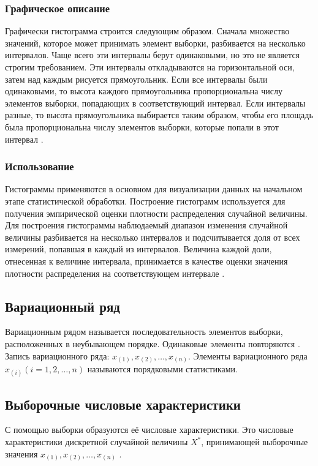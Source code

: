 \documentclass[../body.tex]{subfiles}
\begin{document}
	\subsubsection{Графическое описание}
	Графически гистограмма строится следующим образом. Сначала множество значений, которое может принимать элемент выборки, разбивается на несколько интервалов. Чаще всего эти интервалы берут одинаковыми, но это не является строгим требованием. Эти интервалы откладываются на горизонтальной оси, затем над каждым рисуется прямоугольник. Если все интервалы были одинаковыми, то высота каждого прямоугольника пропорциональна числу элементов выборки, попадающих в соответствующий интервал. Если интервалы разные, то высота прямоугольника выбирается таким образом, чтобы его площадь была пропорциональна числу элементов выборки, которые попали в этот интервал \cite{wikiHistogram}.
	
	\subsubsection{Использование}
	Гистограммы применяются в основном для визуализации данных на начальном этапе статистической обработки. \newline Построение гистограмм используется для получения эмпирической оценки плотности распределения случайной величины. Для построения гистограммы наблюдаемый диапазон изменения случайной величины разбивается на несколько интервалов и подсчитывается доля от всех измерений, попавшая в каждый из интервалов. Величина каждой доли, отнесенная к величине интервала, принимается в качестве оценки значения плотности распределения на соответствующем интервале \cite{wikiHistogram}.
	
	\subsection{Вариационный ряд}
	Вариационным рядом называется последовательность элементов выборки, расположенных в неубывающем порядке. Одинаковые элементы повторяются \cite[c.~409]{probability}.
	Запись вариационного ряда: $x_{(1)}, x_{(2)}, \ldots, x_{(n)}$.
	Элементы вариационного ряда $x_{(i)} (i = 1, 2, \ldots, n)$ называются порядковыми статистиками.
	
	\subsection{Выборочные числовые характеристики}
	С помощью выборки образуются её числовые характеристики. Это числовые характеристики дискретной случайной величины $X^{*}$, принимающей выборочные значения $x_{(1)}, x_{(2)}, \ldots, x_{(n)}$ \cite[c.~411]{probability}.
	
\end{document}
